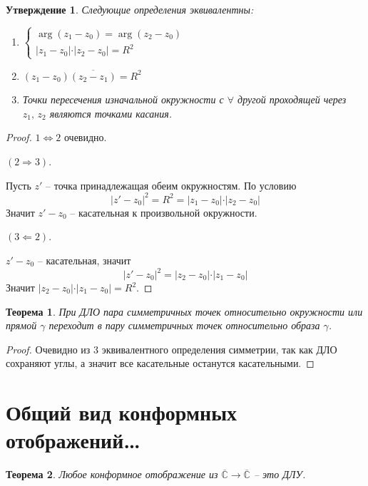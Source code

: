 \documentclass[a4paper,12pt]{article}
\theoremstyle{plain}
\newtheorem{theorem}{Теорема}[section]
\newtheorem{proposition}{Утверждение}[section]
\theoremstyle{definition}
\theoremstyle{remark}
\begin{document}
\begin{proposition}
	Следующие определения эквивалентны:
	\begin{enumerate}
		\item $\begin{cases}
							\arg(z_1 - z_0) = \arg(z_2 - z_0)\\
							\vert z_1 - z_0\vert\cdot\vert z_2 - z_0\vert = R^2
			      \end{cases}$
		\item $(z_1 - z_0)\overline{(z_2 - z_1)} = R^2$
		\item Точки пересечения изначальной окружности с $\forall$ другой проходящей через $z_1,\, z_2$ являются точками касания.
	\end{enumerate}
\end{proposition}

\begin{proof}
	$1 \Leftrightarrow 2$ очевидно.

	$(2 \Rightarrow 3)$.

	Пусть $z'$ -- точка принадлежащая обеим окружностям. По условию
	\[
		\vert z' - z_0\vert^2 = R^2 = \vert z_1 - z_0	\vert\cdot\vert z_2 - z_0\vert
	\]
	Значит $z' - z_0$ -- касательная к произвольной окружности.

	$(3 \Leftarrow 2)$.

	$z' - z_0$ -- касательная, значит
	\[
		\vert z' - z_0\vert^2 = \vert z_2 - z_0\vert\cdot\vert z_1 - z_0\vert
	\]
	Значит $\vert z_2 - z_0\vert\cdot\vert z_1 - z_0\vert = R^2$.
\end{proof}

\begin{theorem}
	При ДЛО пара симметричных точек относительно окружности или прямой $\gamma$ переходит в пару симметричных точек относительно образа $\gamma$.
\end{theorem}

\begin{proof}
	Очевидно из 3 эквивалентного определения симметрии, так как ДЛО сохраняют углы, а значит все касательные останутся касательными.
\end{proof}

\section{Общий вид конформных отображений\dots}
\begin{theorem}
	Любое конформное отображение из $\overline{\mathbb{C}} \to \overline{\mathbb{C}}$ -- это ДЛУ.
\end{theorem}
\end{document}
